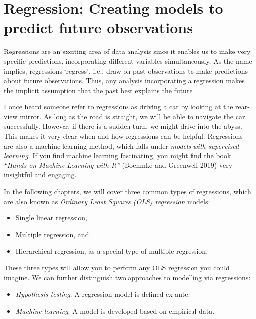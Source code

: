 \documentclass[
  letterpaper,
]{krantz}
\begin{document}

\chapter{Regression: Creating models to predict future
observations}\label{sec-regression}

Regressions are an exciting area of data analysis since it enables us to
make very specific predictions, incorporating different variables
simultaneously. As the name implies, regressions `regress', i.e., draw
on past observations to make predictions about future observations.
Thus, any analysis incorporating a regression makes the implicit
assumption that the past best explains the future.

I once heard someone refer to regressions as driving a car by looking at
the rear-view mirror. As long as the road is straight, we will be able
to navigate the car successfully. However, if there is a sudden turn, we
might drive into the abyss. This makes it very clear when and how
regressions can be helpful. Regressions are also a machine learning
method, which falls under \emph{models with supervised learning}. If you
find machine learning fascinating, you might find the book
\emph{``Hands-on Machine Learning with R''} (Boehmke and Greenwell 2019)
very insightful and engaging.

In the following chapters, we will cover three common types of
regressions, which are also known as \emph{Ordinary Least Squares (OLS)
regression} models:

\begin{itemize}
\item
  Single linear regression,
\item
  Multiple regression, and
\item
  Hierarchical regression, as a special type of multiple regression.
\end{itemize}

These three types will allow you to perform any OLS regression you could
imagine. We can further distinguish two approaches to modelling via
regressions:

\begin{itemize}
\item
  \emph{Hypothesis testing}: A regression model is defined ex-ante.
\item
  \emph{Machine learning}: A model is developed based on empirical data.
\end{itemize}
\end{document}
